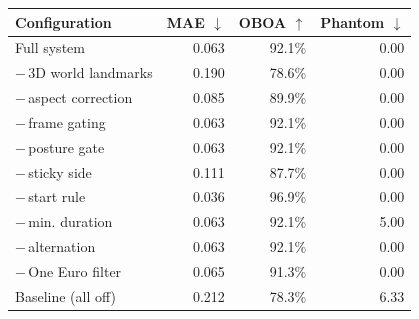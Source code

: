 \begin{tabular}{lrrr}
\toprule
Configuration & MAE $\downarrow$ & OBOA $\uparrow$ & Phantom $\downarrow$\\
\midrule
Full system & 0.063 & 92.1\% & 0.00\\
$-$\,3D world landmarks & 0.190 & 78.6\% & 0.00\\
$-$\,aspect correction & 0.085 & 89.9\% & 0.00\\
$-$\,frame gating & 0.063 & 92.1\% & 0.00\\
$-$\,posture gate & 0.063 & 92.1\% & 0.00\\
$-$\,sticky side & 0.111 & 87.7\% & 0.00\\
$-$\,start rule & 0.036 & 96.9\% & 0.00\\
$-$\,min. duration & 0.063 & 92.1\% & 5.00\\
$-$\,alternation & 0.063 & 92.1\% & 0.00\\
$-$\,One Euro filter & 0.065 & 91.3\% & 0.00\\
Baseline (all off) & 0.212 & 78.3\% & 6.33\\
\bottomrule
\end{tabular}
